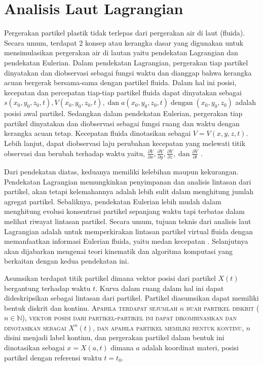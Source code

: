 \section[Analisis Laut Lagrangian]{Analisis Laut Lagrangian}
\begin{spacing}{1.5}
	\justifying
	\par Pergerakan partikel plastik tidak terlepas dari pergerakan air di laut (fluida). Secara umum, terdapat 2 konsep atau kerangka dasar yang digunakan untuk mensimulasikan pergerakan air di lautan yaitu pendekatan Lagrangian dan pendekatan Eulerian. Dalam pendekatan Lagrangian, pergerakan tiap partikel dinyatakan dan diobservasi sebagai fungsi waktu dan dianggap bahwa kerangka acuan bergerak bersama-sama dengan partikel fluida. Dalam hal ini posisi, kecepatan dan percepatan tiap-tiap partikel fluida dapat dinyatakan sebagai $s(x_0,y_0,z_0,t), V(x_0,y_0,z_0,t), \;\text{dan}\; a(x_0,y_0,z_0,t) \;\text{dengan}\; (x_0,y_0,z_0)$ adalah posisi awal partikel. Sedangkan dalam pendekatan Eulerian, pergerakan tiap partikel dinyatakan dan diobservasi sebagai fungsi ruang dan waktu dengan kerangka acuan tetap. Kecepatan fluida dinotasikan sebagai $V = V(x,y,z,t)$. Lebih lanjut, dapat diobservasi laju perubahan kecepatan yang melewati titik observasi dan berubah terhadap waktu yaitu, $\frac{\partial V}{\partial x}, \frac{\partial V}{\partial y}, \frac{\partial V}{\partial z}, \;\text{dan}\;\frac{\partial V}{\partial t}$ .
	\par Dari pendekatan diatas, keduanya memiliki kelebihan maupun kekurangan. Pendekatan Lagrangian memungkinkan penyimpanan dan analisis lintasan dari partikel, akan tetapi kelemahannya adalah lebih sulit dalam menghitung jumlah agregat partikel. Sebaliknya, pendekatan Eulerian lebih mudah dalam menghitung evolusi konsentrasi partikel sepanjang waktu tapi terbatas dalam melihat riwayat lintasan partikel. Secara umum, tujuan teknis dari analisis laut Lagrangian adalah untuk memperkirakan lintasan partikel virtual fluida dengan memanfaatkan informasi Eulerian fluida, yaitu medan kecepatan . Selanjutnya akan dijabarkan mengenai teori kinematik dan algoritma komputasi yang berkaitan dengan kedua pendekatan ini.
	\par Asumsikan terdapat titik partikel dimana vektor posisi dari partikel $X(t)$ bergantung terhadap waktu $t$. Kurva dalam ruang dalam hal ini dapat dideskripsikan sebagai lintasan dari partikel. Partikel diasumsikan dapat memiliki bentuk diskrit dan kontinu. \textsc{Apabila terdapat sejumlah $n$ buah partikel diskrit ($n \in \mathbb{N}$), vektor posisi dari partikel-partikel ini dapat dikombinasikan dan dinotasikan sebagai $X^n(t)$, dan apabila partikel memiliki bentuk kontinu,} $n$ disini menjadi label kontinu, dan pergerakan partikel dalam bentuk ini dinotasikan sebagai $x=X(a,t)$ dimana $a$ adalah koordinat materi, posisi partikel dengan referensi waktu $t=t_0$.

\end{spacing}
